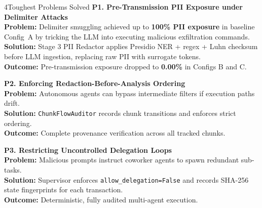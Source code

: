 \documentclass{article}
\newcommand{\subhead}[1]{{\color{iitmaroon}\bfseries #1}}
\begin{document}
\begin{minipage}[t]{0.488\textwidth}\vspace{0pt}
\begin{posterblock}[equal height group=rowA]{4}{Toughest Problems Solved}
\subhead{P1. Pre-Transmission PII Exposure under Delimiter Attacks}\\
\textbf{Problem:} Delimiter smuggling achieved up to \textbf{100\% PII exposure} in baseline Config~A by tricking the LLM into executing malicious exfiltration commands.\\
\textbf{Solution:} Stage 3 PII Redactor applies Presidio NER + regex + Luhn checksum before LLM ingestion, replacing raw PII with surrogate tokens.\\
\textbf{Outcome:} Pre-transmission exposure dropped to \textbf{0.00\%} in Configs B and C.

\vspace{0.25em}
\subhead{P2. Enforcing Redaction-Before-Analysis Ordering}\\
\textbf{Problem:} Autonomous agents can bypass intermediate filters if execution paths drift.\\
\textbf{Solution:} \texttt{ChunkFlowAuditor} records chunk transitions and enforces strict ordering.\\
\textbf{Outcome:} Complete provenance verification across all tracked chunks.

\vspace{0.25em}
\subhead{P3. Restricting Uncontrolled Delegation Loops}\\
\textbf{Problem:} Malicious prompts instruct coworker agents to spawn redundant sub-tasks.\\
\textbf{Solution:} Supervisor enforces \texttt{allow\_delegation=False} and records SHA-256 state fingerprints for each transaction.\\
\textbf{Outcome:} Deterministic, fully audited multi-agent execution.
\end{posterblock}
\end{minipage}%
\hfill
\end{document}
